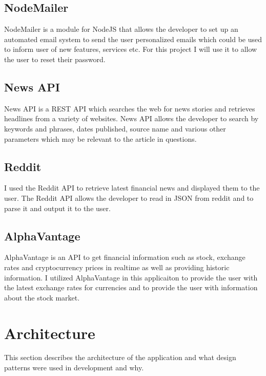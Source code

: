 \subsection{NodeMailer}
NodeMailer is a module for NodeJS that allows the developer to set up an automated email system to send the user personalized emails which could be used to inform user of new features, services etc. For this project I will use it to allow the user to reset their password.
\subsection{News API}
News API is a REST API which searches the web for news stories and retrieves headlines from a variety of websites\cite{NewsAPI}.  News API allows the developer to search by keywords and phrases, dates published, source name and various other parameters which may be relevant to the article in questions.
\subsection{Reddit}
I used the Reddit API to retrieve latest financial news and displayed them to the user.  The Reddit API allows the developer to read in JSON from reddit and to parse it and output it to the user.
\subsection{AlphaVantage}
AlphaVantage is an API to get financial information such as stock, exchange rates and cryptocurrency prices in realtime as well as providing historic information.  I utilized AlphaVantage in this applicaiton to provide the user with the latest exchange rates for currencies and to provide the user with information about the stock market.

\section{Architecture}
This section describes the architecture of the application and what design patterns were used in development and why.

